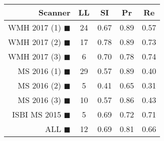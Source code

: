 \begin{tabular}{rcccc}
\toprule
Scanner & LL & SI & Pr & Re \\
\midrule
WMH 2017 (1) {\color[rgb]{ 1.00 0.00 0.00}$\blacksquare$} & 24 & 0.67 & 0.89 & 0.57 \\
WMH 2017 (2) {\color[rgb]{ 1.00 0.50 0.00}$\blacksquare$} & 17 & 0.78 & 0.89 & 0.73 \\
WMH 2017 (3) {\color[rgb]{ 1.00 0.80 0.00}$\blacksquare$} & 6 & 0.70 & 0.78 & 0.74 \\
MS  2016 (1) {\color[rgb]{ 0.20 0.80 0.00}$\blacksquare$} & 29 & 0.57 & 0.89 & 0.40 \\
MS  2016 (2) {\color[rgb]{ 0.00 0.40 1.00}$\blacksquare$} & 5 & 0.41 & 0.65 & 0.31 \\
MS  2016 (3) {\color[rgb]{ 0.60 0.00 1.00}$\blacksquare$} & 10 & 0.57 & 0.86 & 0.43 \\
ISBI MS 2015 {\color[rgb]{ 1.00 0.00 1.00}$\blacksquare$} & 5 & 0.69 & 0.72 & 0.71 \\
\midrule
ALL {\color[rgb]{ 1.00 1.00 1.00}$\blacksquare$} & 12 & 0.69 & 0.81 & 0.66 \\
\bottomrule
\end{tabular}